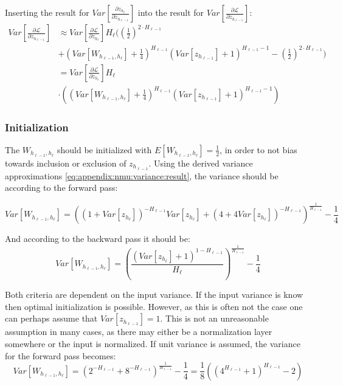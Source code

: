 Inserting the result for $Var\left[\frac{\partial z_{h_\ell}}{\partial z_{h_{\ell-1}}}\right]$ into the result for $Var\left[\frac{\partial \mathcal{L}}{\partial z_{h_{\ell-1}}}\right]$:
\begin{equation}
\begin{aligned}
Var\left[\frac{\partial \mathcal{L}}{\partial z_{h_{\ell-1}}}\right] &\approx Var\left[\frac{\partial \mathcal{L}}{\partial z_{h_\ell}}\right] H_\ell \Bigg(
\left(\frac{1}{2}\right)^{2 \cdot H_{\ell-1}} \\
&+ \left(Var[W_{h_{\ell-1},h_\ell}] + \frac{1}{4}\right)^{H_{\ell-1}} \left(Var[z_{h_{\ell-1}}] + 1\right)^{H_{\ell-1} - 1} - \left(\frac{1}{2}\right)^{2 \cdot H_{\ell-1}}\Bigg) \\
&= Var\left[\frac{\partial \mathcal{L}}{\partial z_{h_\ell}}\right] H_\ell \\
&\cdot \left(
\left(Var[W_{h_{\ell-1},h_\ell}] + \frac{1}{4}\right)^{H_{\ell-1}} \left(Var[z_{h_{\ell-1}}] + 1\right)^{H_{\ell-1} - 1}\right)
\end{aligned}
\label{eq:appendix:nmu:variance:result}
\end{equation}

\subsubsection{Initialization}
\label{sec:appendix:moments:nmu:initialization}

The $W_{h_{\ell-1},h_\ell}$ should be initialized with $E[W_{h_{\ell-1},h_\ell}] = \frac{1}{2}$, in order to not bias towards inclusion or exclusion of $z_{h_{\ell-1}}$. Using the derived variance approximations \eqref{eq:appendix:nmu:variance:result}, the variance should be according to the forward pass:

\begin{equation}
Var[W_{h_{\ell-1},h_\ell}] = \left((1 + Var[z_{h_\ell}])^{-H_{\ell-1}}Var[z_{h_\ell}] + (4 + 4Var[z_{h_\ell}])^{-H_{\ell-1}}\right)^{\frac{1}{H_{\ell-1}}} - \frac{1}{4}
\end{equation}

And according to the backward pass it should be:
\begin{equation}
Var[W_{h_{\ell-1},h_\ell}] = \left( \frac{ \left(Var[z_{h_\ell}] + 1\right)^{1 - H_{\ell-1}} }{H_{\ell}} \right)^{\frac{1}{H_{\ell-1}}} - \frac{1}{4}
\end{equation}

Both criteria are dependent on the input variance. If the input variance is know then optimal initialization is possible. However, as this is often not the case one can perhaps assume that $Var[z_{h_{\ell-1}}] = 1$. This is not an unreasonable assumption in many cases, as there may either be a normalization layer somewhere or the input is normalized. If unit variance is assumed, the variance for the forward pass becomes:
\begin{equation}
Var[W_{h_{\ell-1},h_\ell}] = \left(2^{-H_{\ell-1}} + 8^{-H_{\ell-1}}\right)^{\frac{1}{H_{\ell-1}}} - \frac{1}{4} = \frac{1}{8} \left(\left(4^{H_{\ell-1}} + 1\right)^{H_{\ell-1}} - 2\right)
\end{equation}

